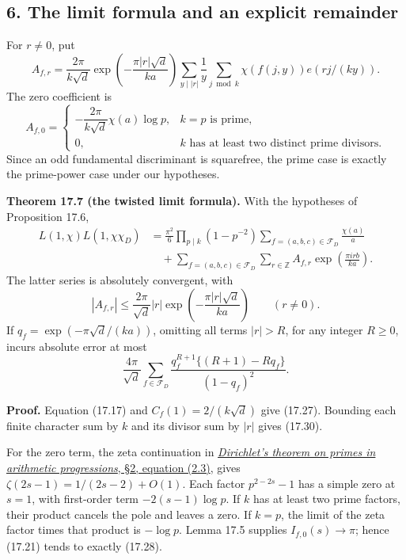 \documentclass[
  11pt,
  a4paper,
]{article}
\begin{document}
\subsection{6. The limit formula and an explicit
remainder}\label{the-limit-formula-and-an-explicit-remainder}

For \(r\ne0\), put \[
 A_{f,r}=\frac{2\pi}{k\sqrt d}
       \exp\!\left(-\frac{\pi|r|\sqrt d}{ka}\right)
       \sum_{y\mid |r|}\frac1y
           \sum_{j\bmod k}\chi(f(j,y))e(rj/(ky)).
 \tag{17.27}
\] The zero coefficient is \[
 A_{f,0}=
 \begin{cases}
 -\dfrac{2\pi}{k\sqrt d}\chi(a)\log p,&k=p\text{ is prime},\\[4pt]
 0,&k\text{ has at least two distinct prime divisors}.
 \end{cases}
 \tag{17.28}
\] Since an odd fundamental discriminant is squarefree, the prime case
is exactly the prime-power case under our hypotheses.

\textbf{Theorem 17.7 (the twisted limit formula).} With the hypotheses
of Proposition 17.6, \[
 \begin{aligned}
 L(1,\chi)L(1,\chi\chi_D)
 &=\frac{\pi^2}{6}\prod_{p\mid k}(1-p^{-2})
                       \sum_{f=(a,b,c)\in\mathcal F_D}\frac{\chi(a)}a\\
 &\quad+\sum_{f=(a,b,c)\in\mathcal F_D}
           \sum_{r\in\mathbb Z}A_{f,r}
                   \exp\!\left(\frac{\pi irb}{ka}\right).
 \end{aligned}
 \tag{17.29}
\] The latter series is absolutely convergent, with \[
 |A_{f,r}|\le\frac{2\pi}{\sqrt d}|r|
                  \exp\!\left(-\frac{\pi|r|\sqrt d}{ka}\right)
 \qquad(r\ne0).
 \tag{17.30}
\] If \(q_f=\exp(-\pi\sqrt d/(ka))\), omitting all terms \(|r|>R\), for
any integer \(R\ge0\), incurs absolute error at most \[
 \frac{4\pi}{\sqrt d}\sum_{f\in\mathcal F_D}
       \frac{q_f^{R+1}\{(R+1)-Rq_f\}}{(1-q_f)^2}.
 \tag{17.31}
\]

\textbf{Proof.} Equation (17.17) and \(C_f(1)=2/(k\sqrt d)\) give
(17.27). Bounding each finite character sum by \(k\) and its divisor sum
by \(|r|\) gives (17.30).

For the zero term, the zeta continuation in
\href{https://kokunoyumeto.github.io/open-math-courses-public/courses/NT-DIRL/NT-DIRL-02.html\#2-periodicity-gives-continuation}{\emph{Dirichlet's
theorem on primes in arithmetic progressions}, §2, equation (2.3)},
gives \(\zeta(2s-1)=1/(2s-2)+O(1)\). Each factor \(p^{2-2s}-1\) has a
simple zero at \(s=1\), with first-order term \(-2(s-1)\log p\). If
\(k\) has at least two prime factors, their product cancels the pole and
leaves a zero. If \(k=p\), the limit of the zeta factor times that
product is \(-\log p\). Lemma 17.5 supplies \(I_{f,0}(s)\to\pi\); hence
(17.21) tends to exactly (17.28).
\end{document}
